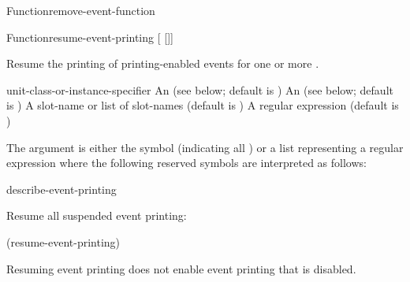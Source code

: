 \documentclass[10pt,twoside,english,pdftex]{article}
\begin{document}
\begin{functiondoc}{Function}{remove-event-function}
\fnnote
\instanceevfnsnyi

\end{functiondoc}


\begin{functiondoc}{Function}{resume-event-printing}%
{[ 
[]] \\
 }
%


\fnsyntax

\fnpurpose Resume the printing of printing-enabled events for one or more
. 

\fnpackage {}

\fnmodule {}

\fnargs
\begin{args}{unit-class-or-instance-specifier}
 An  
(see below; default is )
 An 
(see below; default is )
 A slot-name or list of slot-names
(default is )
 A  regular expression
(default is \code{(*)})
\end{args}

\fndsyntax
\W\supp\tabletop
\eventclassspec
\subeventingspec
\syntaxsep
\unitclassinstancespec
\subclassingspec

\fndescription 
The  argument is either the symbol  (indicating
all ) or a list representing a regular
expression where the following reserved symbols are interpreted as
follows:
\spaceinstanceregexp

\begin{alsos}{describe-event-printing}
\end{alsos}

\fnexample
Resume all suspended event printing:
%
\W\supp
\begin{example}
  (resume-event-printing)
\end{example}

\fnnote
Resuming event printing does not enable event printing that is disabled.

\instanceevfnsnyi

\end{functiondoc}
\end{document}
